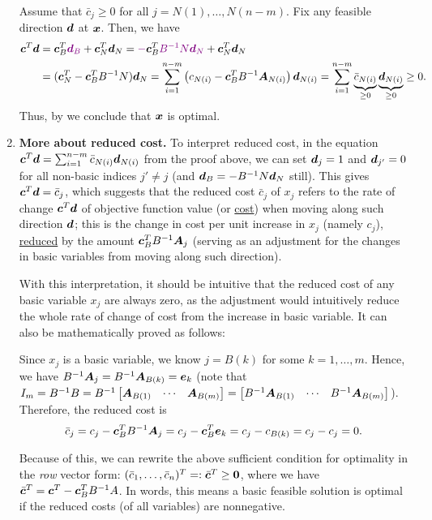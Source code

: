 \begin{enumerate}
\begin{pf}
Assume that \(\bar{c}_j\ge 0\) for all \(j=N(1),\dotsc,N(n-m)\).
Fix any feasible direction \(\bm{d}\) at \(\bm{x}\). Then, we have
\begin{align*}
\bm{c}^{T}\bm{d}&=\bm{c}_{B}^{T}{\color{violet}\bm{d}_{B}}+\bm{c}_{N}^{T}\bm{d}_{N}
={\color{violet}-}\bm{c}_{B}^{T}{\color{violet}B^{-1}N\bm{d}_{N}}+\bm{c}_{N}^{T}\bm{d}_{N} \\
&=(\bm{c}_{N}^{T}-\bm{c}_{B}^{T}B^{-1}N)\bm{d}_{N}
=\sum_{i=1}^{n-m}\left(c_{N(i)}-\bm{c}_{B}^{T}B^{-1}\bm{A}_{N(i)}\right)\bm{d}_{N(i)}
=\sum_{i=1}^{n-m}\underbrace{\bar{c}_{N(i)}}_{\ge 0}\underbrace{\bm{d}_{N(i)}}_{\ge 0}
\ge 0.
\end{align*}
Thus, by  we conclude that \(\bm{x}\) is optimal.
\end{pf}

\item \label{it:reduced-cost} \textbf{More about reduced cost.} To interpret reduced cost, in the
equation \(\bm{c}^{T}\bm{d}=\sum_{i=1}^{n-m}\bar{c}_{N(i)}\bm{d}_{N(i)}\)
from the proof above, we can set \(\bm{d}_{j}=1\) and \(\bm{d}_{j'}=0\) for
all non-basic indices \(j'\ne j\) (and \(\bm{d}_{B}=-B^{-1}N\bm{d}_{N}\)
still). This gives \(\bm{c}^{T}\bm{d}=\bar{c}_j\), which suggests that the
reduced cost \(\bar{c}_j\) of \(x_j\) refers to the rate of change
\(\bm{c}^{T}\bm{d}\) of objective function value (or \underline{cost}) when
moving along such direction \(\bm{d}\); this is the change in cost per unit
increase in \(x_j\) (namely \(c_j\)), \underline{reduced} by the amount
\(\bm{c}_{B}^{T}B^{-1}\bm{A}_j\) (serving as an adjustment for the changes
in basic variables from moving along such direction).

With this interpretation, it should be intuitive that the reduced cost of any
basic variable \(x_j\) are always zero, as the adjustment would intuitively
reduce the whole rate of change of cost from the increase in basic variable. It
can also be mathematically proved as follows:

\begin{pf}
Since \(x_j\) is a basic variable, we know \(j=B(k)\) for some
\(k=1,\dotsc,m\). Hence, we have \(B^{-1}\bm{A}_j
=B^{-1}\bm{A}_{B(k)}
=\bm{e}_k\)
(note that \(I_m=B^{-1}B=B^{-1}\begin{bmatrix}\bm{A}_{B(1)}&\cdots&\bm{A}_{B(m)}\end{bmatrix}
=\begin{bmatrix}B^{-1}\bm{A}_{B(1)}&\cdots&B^{-1}\bm{A}_{B(m)}\end{bmatrix}
\)). Therefore, the reduced cost is
\[
\bar{c}_{j}=c_j-\bm{c}_{B}^{T}B^{-1}\bm{A}_{j}
=c_j-\bm{c}_{B}^{T}\bm{e}_k
=c_j-c_{B(k)}
=c_j-c_j=0.
\]
\end{pf}

Because of this, we can rewrite the above sufficient condition for optimality
in the \emph{row} vector form:
\((\bar{c}_{1},\dotsc,\bar{c}_{n})^{T}=:\bar{\bm{c}}^{T}\ge\bm{0}\), where we have
\(\bar{\bm{c}}^{T}=\bm{c}^{T}-\bm{c}_{B}^{T}B^{-1}A\). In words, this means a
basic feasible solution is optimal if the reduced costs (of all variables) are
nonnegative.
\end{enumerate}
